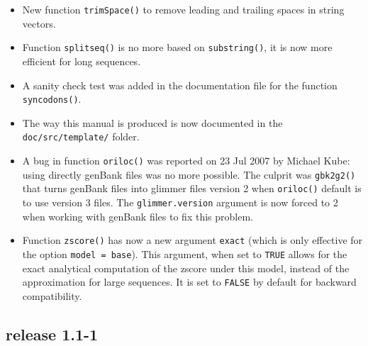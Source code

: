\documentclass{article}
\begin{document}
\begin{itemize}

\item New function \texttt{trimSpace()} to remove leading and trailing
  spaces in string vectors.

\item Function \texttt{splitseq()} is no more based on \texttt{substring()},
  it is now more efficient for long sequences.

\item A sanity check test was added in the documentation file
  for the function \texttt{syncodons()}.

\item The way this manual is produced is now documented in the
  \texttt{doc/src/template/} folder.

\item A bug in function \texttt{oriloc()} was reported on 23 Jul 2007
  by Michael Kube: using directly genBank files was no more possible.
  The culprit was \texttt{gbk2g2()} that turns genBank files into
  glimmer files version 2 when \texttt{oriloc()} default is to use
  version 3 files. The \texttt{glimmer.version} argument is now forced
  to 2 when working with genBank files to fix this problem.
 
\item Function \texttt{zscore()} has now a new argument
  \texttt{exact} (which is only effective for the option
  \texttt{model = base}). This argument, when set to 
  \texttt{TRUE} allows for the exact analytical computation 
  of the zscore under this model, instead of the approximation for
  large sequences. It is set to \texttt{FALSE} by
  default for backward compatibility.
\end{itemize}

\subsection*{release 1.1-1}
\end{document}

